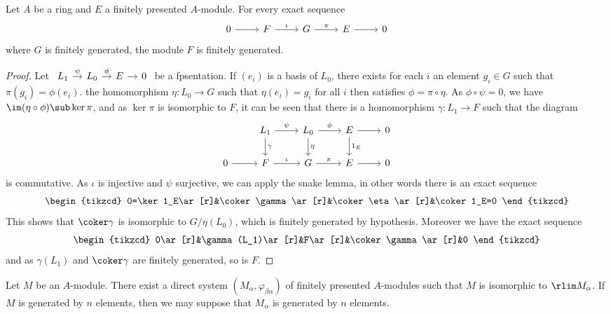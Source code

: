 \begin{proposition}\label{module fpsented ses ker finite}
Let $A$ be a ring and $E$ a finitely presented $A$-module. For every exact sequence
\[\begin{tikzcd}
0\ar[r]&F\ar[r,"\iota"]&G\ar[r,"\pi"]&E\ar[r]&0
\end{tikzcd}\]
where $G$ is finitely generated, the module $F$ is finitely generated.
\end{proposition}
\begin{proof}
Let $\begin{tikzcd}[column sep=10pt]L_1\ar[r,"\psi"]&L_0\ar[r,"\phi"]&E\ar[r]&0 \end{tikzcd}$ be a fpsentation. If $(e_i)$ is a basis of $L_0$, there exists for each $i$ an element $g_i\in G$ such that $\pi(g_i)=\phi(e_i)$. the homomorphism $\eta:L_0\to G$ such that $\eta(e_i)=g_i$ for all $i$ then satisfies $\phi=\pi\circ\eta$. As $\phi\circ\psi=0$, we have $\im(\eta\circ\phi)\sub\ker\pi$, and as $\ker\pi$ is isomorphic to $F$, it can be seen that there is a homomorphism $\gamma:L_1\to F$ such that the diagram
\[\begin{tikzcd}
&L_1\ar[r,"\psi"]\ar[d,"\gamma"]&L_0\ar[r,"\phi"]\ar[d,"\eta"]&E\ar[r]\ar[d,"1_E"]&0\\
0\ar[r]&F\ar[r,"\iota"]&G\ar[r,"\pi"]&E\ar[r]&0
\end{tikzcd}\]
is commutative. As $\iota$ is injective and $\psi$ surjective, we can apply the snake lemma, in other words there is an exact sequence
\[\begin{tikzcd}
0=\ker 1_E\ar[r]&\coker\gamma\ar[r]&\coker\eta\ar[r]&\coker 1_E=0
\end{tikzcd}\]
This shows that $\coker\gamma$ is isomorphic to $G/\eta(L_0)$, which is finitely generated by hypothesis. Moreover we have the exact sequence
\[\begin{tikzcd}
0\ar[r]&\gamma(L_1)\ar[r]&F\ar[r]&\coker\gamma\ar[r]&0
\end{tikzcd}\]
and as $\gamma(L_1)$ and $\coker\gamma$ are finitely generated, so is $F$.
\end{proof}
\begin{proposition}\label{module is direct limit of finitely presented}
Let $M$ be an $A$-module. There exist a direct system $(M_\alpha,\varphi_{\beta\alpha})$ of finitely presented $A$-modules such that $M$ is isomorphic to $\rlim M_\alpha$. If $M$ is generated by $n$ elements, then we may suppose that $M_\alpha$ is generated by $n$ elements.
\end{proposition}
